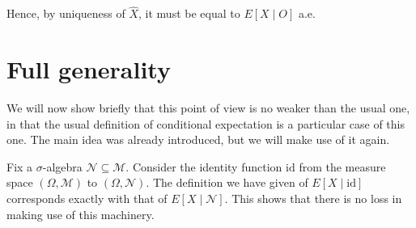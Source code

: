 \documentclass{article}
\newcommand{\M}{\mathcal{M}}
\newcommand{\N}{\mathcal{N}}
\newcommand{\id}{\mathrm{id}}
\begin{document}
	Hence, by uniqueness of $\hat X$, it must be equal to $E[X \mid O]$ a.e.
	
	\section{Full generality}
	
	We will now show briefly that this point of view is no weaker than the usual one, in that the usual definition of conditional expectation is a particular case of this one. The main idea was already introduced, but we will make use of it again.
	
	Fix a $\sigma$-algebra $\N \subseteq \M$. Consider the identity function $\id$ from the measure space $(\Omega, \M)$ to $(\Omega, \N)$. The definition we have given of $E[X \mid \id]$ corresponds exactly with that of $E[X \mid \N]$. This shows that there is no loss in making use of this machinery.
\end{document}
